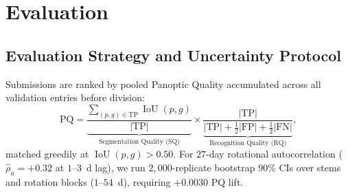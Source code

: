 \documentclass[sigconf]{acmart}
\begin{document}
\section{Evaluation}\label{sec:evaluation}

\subsection{Evaluation Strategy and Uncertainty Protocol}
    Submissions are ranked by pooled Panoptic Quality \cite{kirillov2019panoptic} accumulated across all validation entries before division:
\begin{equation}\label{eq:pq_def}
    \text{PQ} = \underbrace{\frac{\sum_{(p,g) \in \text{TP}} \operatorname{IoU}(p,g)}{|\text{TP}|}}_{\text{Segmentation Quality (SQ)}} \times \underbrace{\frac{|\text{TP}|}{|\text{TP}| + \frac{1}{2}|\text{FP}| + \frac{1}{2}|\text{FN}|}}_{\text{Recognition Quality (RQ)}},
\end{equation}
    matched greedily at $\operatorname{IoU}(p,g) > 0.50$. For $27$-day rotational autocorrelation ($\hat{\rho}_u = +0.32$ at $1$--$3$~d lag), we run $2{,}000$-replicate bootstrap $90\%$ CIs over stems and rotation blocks ($1$--$54$~d), requiring $+0.0030$ PQ lift.
\end{document}
